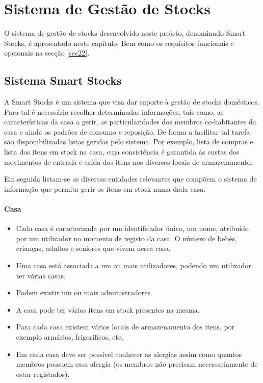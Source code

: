 %
%
\chapter{Sistema de Gestão de Stocks} \label{cap2}

O sistema de gestão de stocks desenvolvido neste projeto, denominado Smart Stocks, é apresentado neste capítulo. Bem como os requisitos funcionais e opcionais na secção \ref{sec22}.

%
%
\section{Sistema Smart Stocks} \label{sec21}
A Smart Stocks é um sistema que visa dar suporte à gestão de stocks domésticos. Para tal é necessário recolher determinadas informações, tais como, as características da casa a gerir, as particularidades dos membros co-habitantes da casa e ainda os padrões de consumo e reposição. De forma a facilitar tal tarefa são disponibilizadas listas geridas pelo sistema. Por exemplo, lista de compras e lista dos itens em stock na casa, cuja consistência é garantida às custas dos movimentos de entrada e saída dos itens nos diversos locais de armazenamento.

Em seguida listam-se as diversas entidades relevantes que compõem o sistema de informação que permita gerir os itens em stock numa dada casa.
\subsubsection{Casa}
\begin{itemize}
	\item Cada casa é caracterizada por um identificador único, um nome, atribuído por um utilizador no momento de registo da casa. O número de bebés, crianças, adultos e seniores que vivem nessa casa.
	\item Uma casa está associada a um ou mais utilizadores, podendo um utilizador ter várias casas. 
	\item Podem existir um ou mais administradores.
	\item A casa pode ter vários itens em stock presentes na mesma.
	\item Para cada casa existem vários locais de armazenamento dos itens, por exemplo armários, frigoríficos, etc.
	\item Em cada casa deve ser possível conhecer as alergias assim como quantos membros possuem essa alergia (os membros não precisam necessariamente de estar registados).
\end{itemize}

